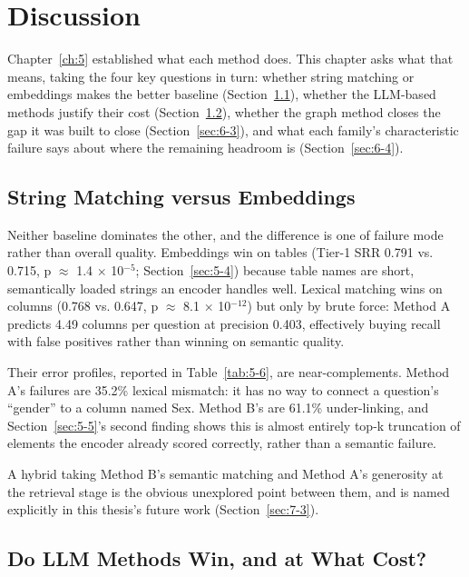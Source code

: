 \chapter{Discussion}\label{ch:6}

Chapter~\ref{ch:5} established what each method does. This chapter asks what that means, taking the four key questions in turn: whether string matching or embeddings makes the better baseline (Section~\ref{sec:6-1}), whether the LLM-based methods justify their cost (Section~\ref{sec:6-2}), whether the graph method closes the gap it was built to close (Section~\ref{sec:6-3}), and what each family's characteristic failure says about where the remaining headroom is (Section~\ref{sec:6-4}).

\section{String Matching versus Embeddings}\label{sec:6-1}

Neither baseline dominates the other, and the difference is one of failure mode rather than overall quality. Embeddings win on tables (Tier-1 SRR 0.791 vs. 0.715, p \ensuremath{\approx} 1.4 \ensuremath{\times} 10\ensuremath{^{-5}}; Section~\ref{sec:5-4}) because table names are short, semantically loaded strings an encoder handles well. Lexical matching wins on columns (0.768 vs. 0.647, p \ensuremath{\approx} 8.1 \ensuremath{\times} 10\ensuremath{^{-12}}) but only by brute force: Method A predicts 4.49 columns per question at precision 0.403, effectively buying recall with false positives rather than winning on semantic quality.

Their error profiles, reported in Table~\ref{tab:5-6}, are near-complements. Method A's failures are 35.2\% lexical mismatch: it has no way to connect a question's ``gender'' to a column named Sex. Method B's are 61.1\% under-linking, and Section~\ref{sec:5-5}'s second finding shows this is almost entirely top-k truncation of elements the encoder already scored correctly, rather than a semantic failure.

A hybrid taking Method B's semantic matching and Method A's generosity at the retrieval stage is the obvious unexplored point between them, and is named explicitly in this thesis's future work (Section~\ref{sec:7-3}).

\section{Do LLM Methods Win, and at What Cost?}\label{sec:6-2}

